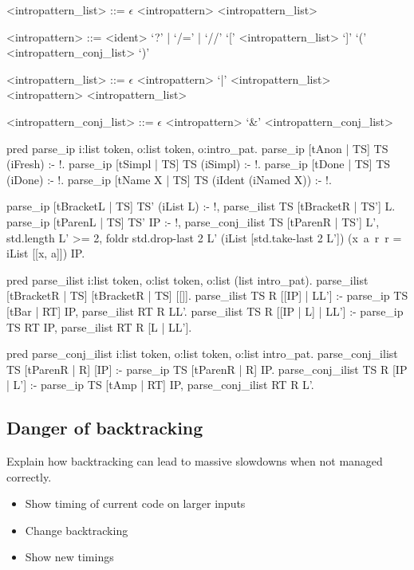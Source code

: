 \documentclass[thesis.tex]{subfiles}
\begin{document}
{\begin{grammar}
  <intropattern\_list> ::= $\epsilon$
  \alt <intropattern> <intropattern\_list>

  <intropattern> ::= <ident>
  \alt `?' | `/=' | `//'
  \alt `[' <intropattern\_list> `]'
  \alt `(' <intropattern\_conj\_list> `)'

  <intropattern\_list> ::= $\epsilon$
  \alt <intropattern> `|' <intropattern\_list>
  \alt <intropattern> <intropattern\_list>

  <intropattern\_conj\_list> ::= $\epsilon$
  \alt <intropattern> `&' <intropattern\_conj\_list>
\end{grammar}

\begin{elpicode}
  pred parse_ip i:list token, o:list token, o:intro_pat.
  parse_ip [tAnon | TS] TS (iFresh) :- !.
  parse_ip [tSimpl | TS] TS (iSimpl) :- !.
  parse_ip [tDone | TS] TS (iDone) :- !.
  parse_ip [tName X | TS] TS (iIdent (iNamed X)) :- !.
\end{elpicode}

\begin{elpicode}
  parse_ip [tBracketL | TS] TS' (iList L) :- !,
  parse_ilist TS [tBracketR | TS'] L.
  parse_ip [tParenL | TS] TS' IP :- !,
  parse_conj_ilist TS [tParenR | TS'] L',
  {std.length L'} >= 2,
  foldr {std.drop-last 2 L'} (iList [{std.take-last 2 L'}]) (x\ a\ r\ r = iList [[x, a]]) IP.
\end{elpicode}

\begin{elpicode}
  pred parse_ilist i:list token, o:list token, o:list (list intro_pat).
  parse_ilist [tBracketR | TS] [tBracketR | TS] [[]].
  parse_ilist TS R [[IP] | LL'] :-
    parse_ip TS [tBar | RT] IP,
    parse_ilist RT R LL'.
  parse_ilist TS R [[IP | L] | LL'] :-
    parse_ip TS RT IP,
    parse_ilist RT R [L | LL'].

  pred parse_conj_ilist i:list token, o:list token, o:list intro_pat.
  parse_conj_ilist TS [tParenR | R] [IP] :- 
    parse_ip TS [tParenR | R] IP.
  parse_conj_ilist TS R [IP | L'] :-
    parse_ip TS [tAmp | RT] IP,
    parse_conj_ilist RT R L'.
\end{elpicode}

\subsection{Danger of backtracking}
Explain how backtracking can lead to massive slowdowns when not managed correctly.
\begin{itemize}
  \item Show timing of current  code on larger inputs
  \item Change backtracking
  \item Show new timings
\end{itemize}

}
\end{document}
